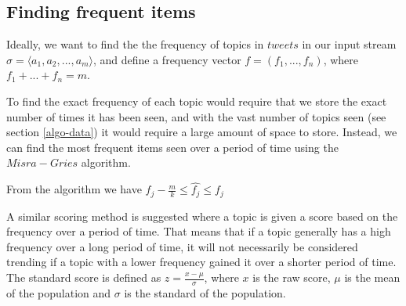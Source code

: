 \subsection{Finding frequent items}\label{algo-frequent}
Ideally, we want to find the the frequency of topics in $tweets$ in our input stream $\sigma = \langle a_{1}, a_{2},...,a_{m}\rangle$, and define a frequency vector $f = (f_{1},...,f_{n})$, where $f_{1} + ... + f_{n} = m$. 

To find the exact frequency of each topic would require that we store the exact number of times it has been seen, and with the vast number of topics seen (see section \ref{algo-data}) it would require a large amount of space to store. Instead, we can find the most frequent items seen over a period of time using the $Misra-Gries$ algorithm.\cite{Amit}

From the algorithm we have  $f_j - \frac{m}{k} \leq \hat{f_j} \leq f_j$

A similar scoring method is suggested where a topic is given a score based on the frequency over a period of time. That means that if a topic generally has a high frequency over a long period of time, it will not necessarily be considered trending if a topic with a lower frequency gained it over a shorter period of time. The standard score is defined as $z = \frac{x - \mu}{\sigma}$, where $x$ is the raw score, $\mu$ is the mean of the population and $\sigma$ is the standard of the population.